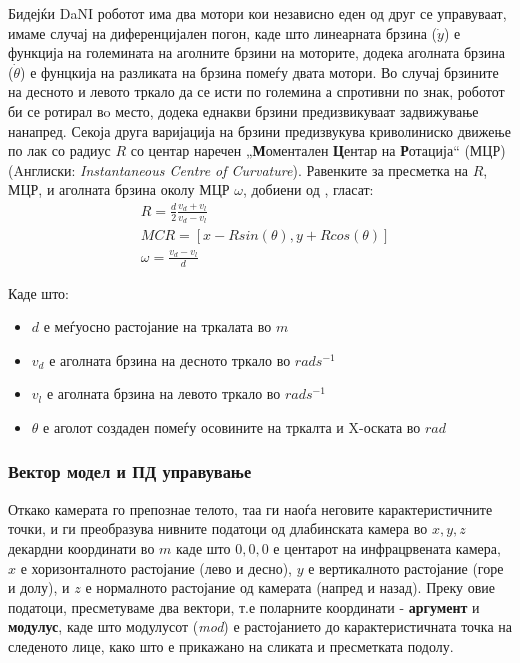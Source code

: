 \documentclass[11pt]{article}
\begin{document}
      Бидејќи DaNI роботот има два мотори кои независно еден од друг се управуваат, имаме случај на диференцијален погон, каде што линеарната брзина ($\dot y$) е функција на големината на аголните брзини на моторите, додека аголната брзина ($\dot \theta$) е фунцкија на разликата на брзина помеѓу двата мотори. Во случај брзините на десното и левото тркало да се исти по големина а спротивни по знак, роботот би се ротирал вo место, додека еднакви брзини предизвикуваат задвижување нанапред. Секоја друга варијација на брзини предизвукува криволиниско движење по лак со радиус $R$ со центар наречен „\textbf{М}оментален \textbf{Ц}ентар на \textbf{Р}отација“ (МЦР) (Aнглиски: \textit{Instantaneous Centre of Curvature}). Равенките за пресметка на $R$, МЦР, и аголната брзина околу МЦР $\omega$, добиени од \cite{differential_drive_robots}, гласат:
      \begin{align}
          & R = \frac{d}{2} \frac{v_d + v_l}{v_d - v_l} \\
          & {MCR} = [x - Rsin(\theta), y + Rcos(\theta)] \\
          & \omega = \frac{v_d - v_l}{d}
      \end{align}


      Каде што:
      \begin{itemize}
        \item $d$ е меѓуосно растојание на тркалата во $m$
        \item $v_d$ е аголната брзина на десното тркало во $rad s^{-1}$
        \item $v_l$ е аголната брзина на левото тркало во $rad s^{-1}$
        \item $\theta$ е аголот создаден помеѓу осовините на тркалта и X-оската во $rad$
      \end{itemize}

    \subsubsection{Вектор модел и ПД управување} \label{sec:doublePD}
      Откако камерата го препознае телото, таа ги наоѓа неговите карактеристичните точки, и ги преобразува нивните податоци од длабинската камера во $ x,y,z $ декардни координати во $ m $ каде што $ 0,0,0 $ е центарот на инфрацрвената камера, $x$ е хоризонталното растојание (лево и десно), $y$ е вертикалното растојание (горе и долу), и $z$ е нормалното растојание од камерата (напред и назад). Преку овие податоци, пресметуваме два вектори, т.е поларните координати - \textbf{аргумент} и \textbf{модулус}, каде што модулусот (\textit{mod}) е растојанието до карактеристичната точка на следеното лице, како што е прикажано на сликата и пресметката подолу.
\end{document}
